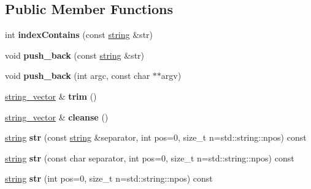 \subsection*{\-Public \-Member \-Functions}
\begin{DoxyCompactItemize}
\item 
\hypertarget{classmbdev_1_1string__vector_a95085457cf0a524f0cf7fa4017781372}{int {\bfseries index\-Contains} (const \hyperlink{classmbdev_1_1string}{string} \&str)}\label{classmbdev_1_1string__vector_a95085457cf0a524f0cf7fa4017781372}

\item 
\hypertarget{classmbdev_1_1string__vector_a899d556cda887346b0c4ad7ad424f980}{void {\bfseries push\-\_\-back} (const \hyperlink{classmbdev_1_1string}{string} \&str)}\label{classmbdev_1_1string__vector_a899d556cda887346b0c4ad7ad424f980}

\item 
\hypertarget{classmbdev_1_1string__vector_a4e9f55d5457e441978f0d43838791947}{void {\bfseries push\-\_\-back} (int argc, const char $\ast$$\ast$argv)}\label{classmbdev_1_1string__vector_a4e9f55d5457e441978f0d43838791947}

\item 
\hypertarget{classmbdev_1_1string__vector_a79e5788b6cbbacf7ce2197557c69576e}{\hyperlink{classmbdev_1_1string__vector}{string\-\_\-vector} \& {\bfseries trim} ()}\label{classmbdev_1_1string__vector_a79e5788b6cbbacf7ce2197557c69576e}

\item 
\hypertarget{classmbdev_1_1string__vector_a2631a3889a8ff8b6fd9b9e5c761e0d9a}{\hyperlink{classmbdev_1_1string__vector}{string\-\_\-vector} \& {\bfseries cleanse} ()}\label{classmbdev_1_1string__vector_a2631a3889a8ff8b6fd9b9e5c761e0d9a}

\item 
\hypertarget{classmbdev_1_1string__vector_a9c79f3c3cbec193a841fcf79d54745d7}{\hyperlink{classmbdev_1_1string}{string} {\bfseries str} (const \hyperlink{classmbdev_1_1string}{string} \&separator, int pos=0, size\-\_\-t n=std\-::string\-::npos) const }\label{classmbdev_1_1string__vector_a9c79f3c3cbec193a841fcf79d54745d7}

\item 
\hypertarget{classmbdev_1_1string__vector_a9dae9a795bda0f5dd7154740c353ed79}{\hyperlink{classmbdev_1_1string}{string} {\bfseries str} (const char separator, int pos=0, size\-\_\-t n=std\-::string\-::npos) const }\label{classmbdev_1_1string__vector_a9dae9a795bda0f5dd7154740c353ed79}

\item 
\hypertarget{classmbdev_1_1string__vector_a7c8e1568055ee349454b477e37573a16}{\hyperlink{classmbdev_1_1string}{string} {\bfseries str} (int pos=0, size\-\_\-t n=std\-::string\-::npos) const }\label{classmbdev_1_1string__vector_a7c8e1568055ee349454b477e37573a16}

\end{DoxyCompactItemize}
